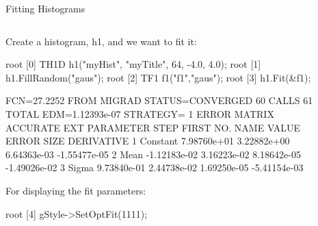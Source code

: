 \documentclass[aspectratio=169]{beamer}
\newcommand{\myfigure}[2]{
    \begin{figure}
        \makebox[\textwidth]{%
            \texttt{[image: \#2]}
        }
    \end{figure}
}
\begin{document}
\begin{frame}[fragile]{Fitting Histograms}

    \begin{columns}
        \begin{column}{0.67\textwidth}

            Create a histogram, h1, and we want to fit it:
            \begin{myterminal}
root [0] TH1D h1("myHist", "myTitle", 64, -4.0, 4.0);
root [1] h1.FillRandom("gaus");
root [2] TF1 f1("f1","gaus");
root [3] h1.Fit(&f1);
            \end{myterminal}
            \vspace{-3mm}
            \begin{myterminaltiny}
 FCN=27.2252 FROM MIGRAD    STATUS=CONVERGED      60 CALLS          61 TOTAL
                     EDM=1.12393e-07    STRATEGY= 1      ERROR MATRIX ACCURATE
  EXT PARAMETER                                   STEP         FIRST
  NO.   NAME      VALUE            ERROR          SIZE      DERIVATIVE
   1  Constant     7.98760e+01   3.22882e+00   6.64363e-03  -1.55477e-05
   2  Mean        -1.12183e-02   3.16223e-02   8.18642e-05  -1.49026e-02
   3  Sigma        9.73840e-01   2.44738e-02   1.69250e-05  -5.41154e-03
            \end{myterminaltiny}
            For displaying the fit parameters:
            \begin{myterminal}
root [4] gStyle->SetOptFit(1111);
            \end{myterminal}

        \end{column}
        \begin{column}{0.33\textwidth}
            \myfigure{1.15}{figure-006.pdf}
        \end{column}
    \end{columns}

\end{frame}
\end{document}
